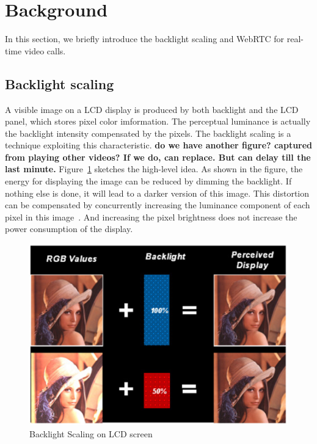 
\section{Background}
\label{sec:background}
In this section, we briefly introduce the backlight scaling and WebRTC
for real-time video calls.

\subsection{Backlight scaling}
A visible image on a LCD display is produced by both backlight and the LCD
panel, which stores pixel color imformation. The perceptual luminance
is actually the backlight intensity compensated by the pixels. The
backlight scaling is a technique  exploiting
this characteristic. 
{\bf do we have another figure? captured from playing other videos? If
we do, can replace. But can delay till the last minute.}
Figure~\ref{fig:backlightscaling} sketches the high-level idea. As
shown in the figure, the energy for displaying the image can be
reduced by dimming the backlight. If  nothing else is done, 
 it will lead
to a darker version of this image. This distortion can be compensated
by concurrently increasing the luminance component of each pixel in
this image~\cite{PMLDV03, CHP07, CCS06, CSC02}. And increasing the
pixel brightness does not increase the power consumption of the
display.


\begin{figure}[!htb]
  \begin{center}
    \includegraphics[scale=.75]{./figures/backlightscaling.eps}
    \caption{Backlight Scaling on LCD screen}
    \label{fig:backlightscaling}
  \end{center}
\end{figure}

